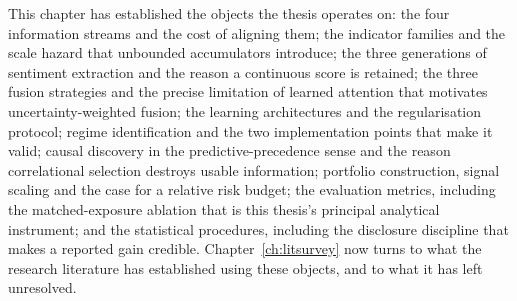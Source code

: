 This chapter has established the objects the thesis operates on: the four information streams
and the cost of aligning them; the indicator families and the scale hazard that unbounded
accumulators introduce; the three generations of sentiment extraction and the reason a
continuous score is retained; the three fusion strategies and the precise limitation of learned
attention that motivates uncertainty-weighted fusion; the learning architectures and the
regularisation protocol; regime identification and the two implementation points that make it
valid; causal discovery in the predictive-precedence sense and the reason correlational
selection destroys usable information; portfolio construction, signal scaling and the case for a
relative risk budget; the evaluation metrics, including the matched-exposure ablation that is
this thesis's principal analytical instrument; and the statistical procedures, including the
disclosure discipline that makes a reported gain credible. Chapter~\ref{ch:litsurvey} now turns
to what the research literature has established using these objects, and to what it has left
unresolved.
